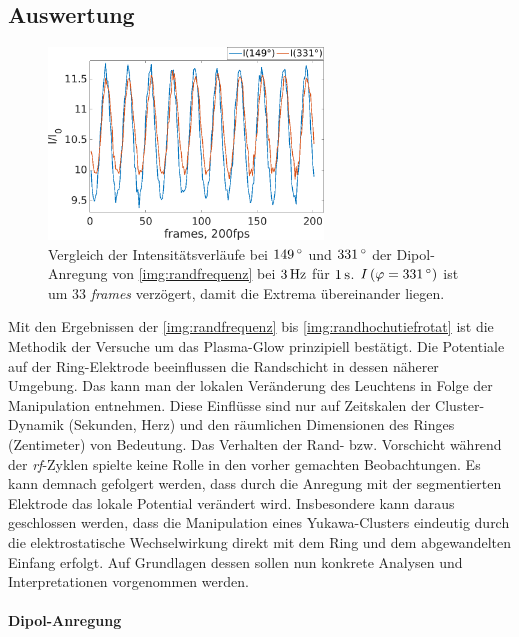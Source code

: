\documentclass[numbers=noenddot,a4paper,notitlepage,twoside,BCOR15mm]{scrbook}
\newcommand{\degree}{^\circ}
\newcommand{\tilt}[1]{\textit{#1}}
\begin{document}
			\subsection{Auswertung}

					\begin{figure}[!b]
						\centering
						\hspace{-0.7cm}\includegraphics[width=0.65\textwidth,height=0.4\textwidth]{figs/auswertung/plasmaglw/intensdipol181u3313Hz1sek.png}
						\caption{Vergleich der Intensitätsverläufe bei $\unit[149]{\degree}$  und $\unit[331]{\degree}$ der Dipol-Anregung von \ref{img:randfrequenz} bei $\unit[3]{Hz}$ für $\unit[1]{s}$. $I\left(\varphi=\unit[331]{\degree}\right)$ ist um 33 \tilt{frames} verzögert, damit die Extrema übereinander liegen.}
						\label{img:intensdipol}
					\end{figure}

				Mit den Ergebnissen der \ref{img:randfrequenz} bis \ref{img:randhochutiefrotat} ist die Methodik der Versuche um das Plasma-Glow prinzipiell bestätigt. Die Potentiale auf der Ring-Elektrode beeinflussen die Randschicht in dessen näherer Umgebung. Das kann man der lokalen Veränderung des Leuchtens in Folge der Manipulation entnehmen. Diese Einflüsse sind nur auf Zeitskalen der Cluster-Dynamik (Sekunden, Herz) und den räumlichen Dimensionen des Ringes (Zentimeter) von Bedeutung. Das Verhalten der Rand- bzw. Vorschicht während der \tilt{rf}-Zyklen spielte keine Rolle in den vorher gemachten Beobachtungen. Es kann demnach gefolgert werden, dass durch die Anregung mit der segmentierten Elektrode das lokale Potential verändert wird. Insbesondere kann daraus geschlossen werden, dass die Manipulation eines Yukawa-Clusters eindeutig durch die elektrostatische Wechselwirkung direkt mit dem Ring und dem abgewandelten Einfang erfolgt. Auf Grundlagen dessen sollen nun konkrete Analysen und Interpretationen vorgenommen werden.

				\paragraph{Dipol-Anregung}
\end{document}
